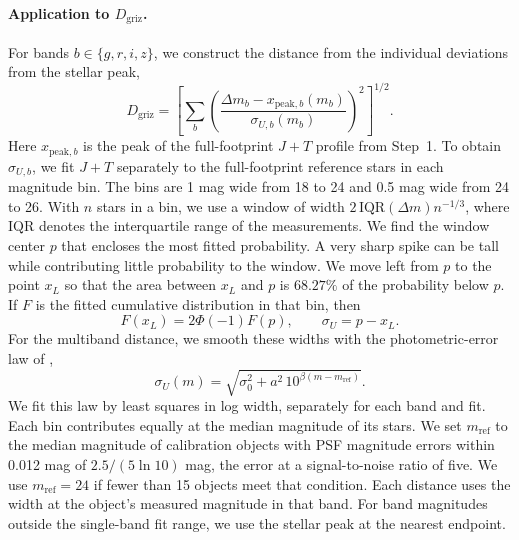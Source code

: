 \paragraph{Application to \(D_{\mathrm{griz}}\).}
For bands \(b\in\{g,r,i,z\}\), we construct the distance from the
individual deviations from the stellar peak,
\begin{equation}
 D_{\mathrm{griz}}=
 \left[
 \sum_b\left(
 \frac{\Delta m_b-x_{\mathrm{peak},b}(m_b)}{\sigma_{U,b}(m_b)}
 \right)^2
 \right]^{1/2}.
 \label{eq:v12-appendix-distance}
\end{equation}
Here \(x_{\mathrm{peak},b}\) is the peak of the full-footprint
\(J+T\) profile from Step~1. To obtain \(\sigma_{U,b}\), we fit
\(J+T\) separately to the full-footprint reference stars in each
magnitude bin. The bins are 1 mag wide from 18 to 24
and 0.5 mag wide from 24 to 26. With \(n\) stars in a bin, we use a
window of width \(2\,\mathrm{IQR}(\Delta m)n^{-1/3}\), where
\(\mathrm{IQR}\) denotes the interquartile range of the measurements.
We find the window center \(p\) that encloses the most fitted
probability. A very sharp spike can be tall while contributing little
probability to the window. We move left from \(p\) to the point \(x_L\)
so that the area between \(x_L\) and \(p\) is \(68.27\%\) of the
probability below \(p\). If \(F\) is the fitted cumulative distribution
in that bin, then
\begin{equation}
 F(x_L)=2\Phi(-1)F(p),\qquad \sigma_U=p-x_L.
 \label{eq:v12-appendix-left-width}
\end{equation}
For the multiband distance, we smooth these widths with the
photometric-error law of \citet[their equation 5]{2007AJ....134.2236S},
\[
 \sigma_U(m)=\sqrt{\sigma_0^2+a^2\,10^{\beta(m-m_{\mathrm{ref}})}}.
\]
We fit this law by least squares in log width, separately for each
band and fit.
Each bin contributes equally at the median magnitude of its stars.
We set \(m_{\mathrm{ref}}\) to the median magnitude of calibration
objects with PSF magnitude errors within 0.012 mag of
\(2.5/(5\ln 10)\) mag, the error at a signal-to-noise ratio of five.
We use \(m_{\mathrm{ref}}=24\) if fewer than 15 objects meet that
condition. Each distance uses the width at the object's measured
magnitude in that band. For band magnitudes outside the single-band
fit range, we use the stellar peak at the nearest endpoint.

